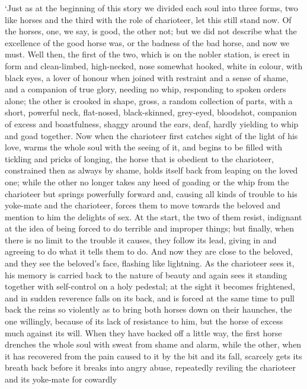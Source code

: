 ‘Just as at the beginning of this story we divided each soul into three
forms, two like horses
and the third with the role  of charioteer, let this still stand
now. Of the horses, one, we say, is good, the other not; but we did not
describe what the excellence of the good horse was, or the badness of
the bad horse, and now we must. Well then, the first of the two, which
is on the nobler
station, is erect in
form and clean-limbed,  high-necked, nose somewhat hooked, white
in colour, with black eyes, a lover of honour when joined with restraint
and a sense of shame, and a companion of true glory, needing no whip,
responding to spoken
orders alone; the other
is crooked  in shape, gross, a random collection of parts, with
a short, powerful neck, flat-nosed, black-skinned, grey-eyed, bloodshot,
companion of excess and
boastfulness, shaggy around the ears, deaf, hardly yielding to whip and
goad together. Now  when the charioteer first catches sight of
the light of his love, warms the whole soul with the seeing of it, and
begins to be filled with tickling and pricks of longing, the horse that
is  obedient to the charioteer, constrained then as always by
shame, holds itself back from leaping on the loved one; while the other
no longer takes any heed of goading or the whip from the charioteer but
springs powerfully forward and, causing all  kinds of trouble to
his yoke-mate and the charioteer, forces them to move towards the
beloved and mention to him the delights of sex. At the start, the two of
them resist, indignant  at the idea of being forced to do
terrible and improper things; but finally, when there is no limit to the
trouble it causes, they follow its lead, giving in and agreeing to do
what it tells them to do. And now they are close to the beloved, and
they see the beloved's face, flashing like lightning. As the charioteer
sees it,  his memory is carried back to the nature of beauty and
again sees it standing together with self-control on a holy pedestal; at
the sight it becomes frightened, and in sudden reverence falls on its
back, and is forced at the same time to pull back the reins  so
violently as to bring both horses down on their haunches, the one
willingly, because of its lack of resistance to him, but the horse of
excess much against its
will. When they have backed off a little way, the first horse drenches
the whole soul  with sweat from shame and alarm, while the
other, when it has recovered from the pain caused to it by the bit and
its fall, scarcely gets its breath back before it breaks into angry
abuse, repeatedly reviling the charioteer and its yoke-mate for cowardly
